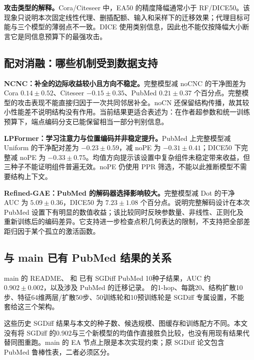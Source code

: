 \textbf{攻击类型的解释。}Cora/Citeseer 中，EA50 的精度降幅通常小于 RF/DICE50。该现象只说明本次固定线性代理、删插配额、输入和采样下的迁移效果；代理目标可能与三个模型的薄弱点不一致。DICE 使用类别信息，因此也不能仅按降幅大小断言它是同信息预算下的最强攻击。

\subsection{配对消融：哪些机制受到数据支持}

\textbf{NCNC：补全的边际收益较小且方向不稳定。}完整模型减 noCNC 的干净图差为 Cora $0.14\pm0.52$、Citeseer $-0.15\pm0.35$、PubMed $0.21\pm0.37$ 个百分点。完整模型的攻击表现不能直接归因于一次共同邻居补全。noCN 还保留结构传播，故其较小性能差不说明结构没有作用。当前结果更适合表述为：在作者超参数和统一训练预算下，端点编码分支已能保留相当一部分判别信息。

\textbf{LPFormer：学习注意力与位置编码并非稳定提升。}PubMed 上完整模型减 Uniform 的干净配对差为 $-0.23\pm0.59$，减 noPE 为 $-0.31\pm0.41$；DICE50 下完整减 noPE 为 $-0.33\pm0.75$。均值方向提示该设置中复杂组件未稳定带来收益，但三种子不能证明组件普遍无效。noPE 仍使用 PPR 筛选，不能以此推断模型不需要结构上下文。

\textbf{Refined-GAE：PubMed 的解码器选择影响较大。}完整模型减 Dot 的干净 AUC 为 $5.09\pm0.36$，DICE50 为 $7.23\pm1.08$ 个百分点。说明完整解码设计在本次 PubMed 设置下有明显的数值收益；该比较同时反映参数量、非线性、正则化及重新训练后的编码差异。它支持进一步检查点积几何表达的限制，不支持把全部差距归因于某个孤立的激活函数。

\subsection{与 main 已有 PubMed 结果的关系}
main 的 README、 和  已有 SGDiff PubMed 10种子结果，AUC 约 $0.902\pm0.002$，以及涉及 PubMed 的迁移记录。 的1-hop、每跳20、结构扩散10步、特征64维两层/扩散50步、50训练轮和10预训练轮是 SGDiff 专属设置，不能套给这三个架构。

这些历史 SGDiff 结果与本文的种子数、候选规模、图缓存和训练配方不同。本文没有将 SGDiff 的0.902与三个新模型的均值作直接胜负比较，也没有用现有结果代替同图重跑。main 的 EA 节点上限是本次实现约束；原 SGDiff 论文包含 PubMed 鲁棒性表，二者必须区分。
